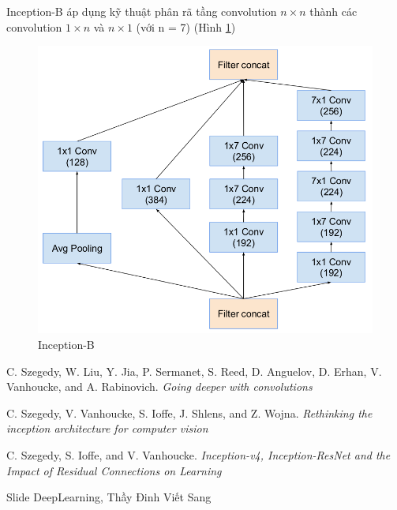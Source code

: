 \documentclass[a4paper,12pt]{report}
\begin{document}
\par Inception-B áp dụng kỹ thuật phân rã tầng convolution $n \times n$ thành các convolution $1 \times n$ và $n \times 1$ (với n = 7) (Hình \ref{fig_inceptionB})
\begin{figure}[H]
\centering 
\includegraphics[scale=0.5]{inceptionB.png}
\caption{Inception-B}
\label{fig_inceptionB}
\end{figure}


\begin{thebibliography}{9}
 C. Szegedy, W. Liu, Y. Jia, P. Sermanet, S. Reed, D. Anguelov, D. Erhan, V. Vanhoucke, and A. Rabinovich. \textit{Going deeper with convolutions}

 C. Szegedy, V. Vanhoucke, S. Ioffe, J. Shlens, and Z. Wojna. \textit{Rethinking the inception architecture for computer vision}

 C. Szegedy, S. Ioffe, and V. Vanhoucke. \textit{Inception-v4, Inception-ResNet and the Impact of Residual Connections on Learning}

 Slide DeepLearning, Thầy Đinh Viết Sang 

\end{thebibliography}
\end{document}
